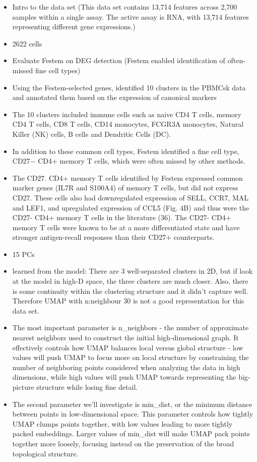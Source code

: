 \documentclass[
  12pt]{article}
\begin{document}
\begin{itemize}
\item
  Intro to the data set (This data set contains 13,714 features across
  2,700 samples within a single assay. The active assay is RNA, with
  13,714 features representing different gene expressions.)
\item
  2622 cells
\item
  Evaluate Festem on DEG detection (Festem enabled identification of
  often-missed fine cell types)
\item
  Using the Festem-selected genes, identified 10 clusters in the PBMCsk
  data and annotated them based on the expression of canonical markers
\item
  The 10 clusters included immune cells such as naive CD4 T cells,
  memory CD4 T cells, CD8 T cells, CD14 monocytes, FCGR3A monocytes,
  Natural Killer (NK) cells, B cells and Dendritic Cells (DC).
\item
  In addition to these common cell types, Festem identified a fine cell
  type, CD27− CD4+ memory T cells, which were often missed by other
  methods.
\item
  The CD27. CD4+ memory T cells identified by Festem expressed common
  marker genes (IL7R and S100A4) of memory T cells, but did not express
  CD27. These cells also had downregulated expression of SELL, CCR7, MAL
  and LEF1, and upregulated expression of CCL5 (Fig. 4B) and thus were
  the CD27- CD4+ memory T cells in the literature (36). The CD27- CD4+
  memory T cells were known to be at a more differentiated state and
  have stronger antigen-recall responses than their CD27+ counterparts.
\item
  15 PCs
\item
  learned from the model: There are 3 well-separated clusters in 2D, but
  if look at the model in high-D space, the three clusters are much
  closer. Also, there is some continuity within the clustering structure
  and it didn't capture well. Therefore UMAP with n:neighbour 30 is not
  a good representation for this data set.
\item
  The most important parameter is n\_neighbors - the number of
  approximate nearest neighbors used to construct the initial
  high-dimensional graph. It effectively controls how UMAP balances
  local versus global structure - low values will push UMAP to focus
  more on local structure by constraining the number of neighboring
  points considered when analyzing the data in high dimensions, while
  high values will push UMAP towards representing the big-picture
  structure while losing fine detail.
\item
  The second parameter we'll investigate is min\_dist, or the minimum
  distance between points in low-dimensional space. This parameter
  controls how tightly UMAP clumps points together, with low values
  leading to more tightly packed embeddings. Larger values of min\_dist
  will make UMAP pack points together more loosely, focusing instead on
  the preservation of the broad topological structure.
\end{itemize}
\end{document}
